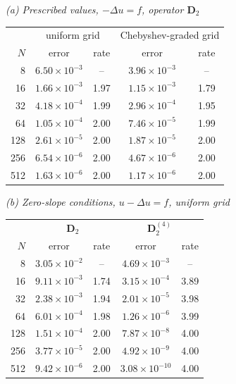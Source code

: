 \textit{(a) Prescribed values, $-\Delta u=f$, operator $\mathbf D_2$}\\[2pt]
\begin{tabular}{r cc cc}
\toprule
& \multicolumn{2}{c}{uniform grid} & \multicolumn{2}{c}{Chebyshev-graded grid}\\
$N$ & error & rate & error & rate\\
\midrule
8 & $6.50{\times}10^{-3}$ & -- & $3.96{\times}10^{-3}$ & --\\
16 & $1.66{\times}10^{-3}$ & 1.97 & $1.15{\times}10^{-3}$ & 1.79\\
32 & $4.18{\times}10^{-4}$ & 1.99 & $2.96{\times}10^{-4}$ & 1.95\\
64 & $1.05{\times}10^{-4}$ & 2.00 & $7.46{\times}10^{-5}$ & 1.99\\
128 & $2.61{\times}10^{-5}$ & 2.00 & $1.87{\times}10^{-5}$ & 2.00\\
256 & $6.54{\times}10^{-6}$ & 2.00 & $4.67{\times}10^{-6}$ & 2.00\\
512 & $1.63{\times}10^{-6}$ & 2.00 & $1.17{\times}10^{-6}$ & 2.00\\
\bottomrule
\end{tabular}

\medskip
\textit{(b) Zero-slope conditions, $u-\Delta u=f$, uniform grid}\\[2pt]
\begin{tabular}{r cc cc}
\toprule
& \multicolumn{2}{c}{$\mathbf D_2$} & \multicolumn{2}{c}{$\mathbf D_2^{(4)}$}\\
$N$ & error & rate & error & rate\\
\midrule
8 & $3.05{\times}10^{-2}$ & -- & $4.69{\times}10^{-3}$ & --\\
16 & $9.11{\times}10^{-3}$ & 1.74 & $3.15{\times}10^{-4}$ & 3.89\\
32 & $2.38{\times}10^{-3}$ & 1.94 & $2.01{\times}10^{-5}$ & 3.98\\
64 & $6.01{\times}10^{-4}$ & 1.98 & $1.26{\times}10^{-6}$ & 3.99\\
128 & $1.51{\times}10^{-4}$ & 2.00 & $7.87{\times}10^{-8}$ & 4.00\\
256 & $3.77{\times}10^{-5}$ & 2.00 & $4.92{\times}10^{-9}$ & 4.00\\
512 & $9.42{\times}10^{-6}$ & 2.00 & $3.08{\times}10^{-10}$ & 4.00\\
\bottomrule
\end{tabular}
